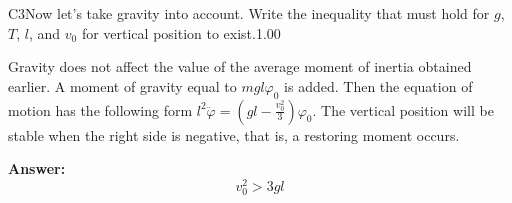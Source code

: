 \documentclass[11pt,a4paper]{article}
\begin{document}
\begin{solcard}{C3}{Now let's take gravity into account. Write the inequality that must hold for $g$, $T$, $l$, and $v_0$ for vertical position to exist.}{1.00}

Gravity does not affect the value of the average moment of inertia obtained earlier. A moment of gravity equal to $mgl \varphi_0$ is added. Then the equation of motion has the following form $l^2 \ddot{\varphi} = \left( gl - \frac{v_0^2}{3} \right) \varphi_0$. The vertical position will be stable when the right side is negative, that is, a restoring moment occurs.

\par\smallskip\noindent\textbf{Answer:} \[v_0^2>3gl\]
\end{solcard}
\end{document}
